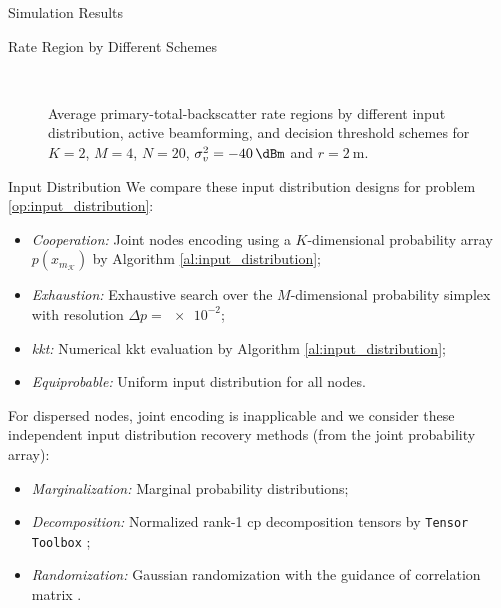 \documentclass[journal]{IEEEtran}
\begin{document}
\begin{section}{Simulation Results}
	\begin{subsection}{Rate Region by Different Schemes}
		\begin{figure}[!t]
			\centering
			\subfloat[Input Distribution, $Q=1$\label{fg:region_distribution}]{
				\resizebox{0.6\columnwidth}{!}{
					
				}
			}
			\\
			\subfloat[Active Beamforming, $Q=4$\label{fg:region_beamforming}]{
				\resizebox{0.48\columnwidth}{!}{
					
				}
			}
			\subfloat[Decision Threshold, $Q=4$\label{fg:region_threshold}]{
				\resizebox{0.48\columnwidth}{!}{
					
				}
			}
			\caption{
				Average primary-total-backscatter rate regions by different input distribution, active beamforming, and decision threshold schemes for $K=2$, $M=4$, $N=20$, $\sigma_v^2=\SI{-40}{\dBm}$ and $r=\SI{2}{\meter}$.
			}
		\end{figure}
		\begin{subsubsection}{Input Distribution}
			We compare these input distribution designs for problem \eqref{op:input_distribution}:
			\begin{itemize}
				\item \emph{Cooperation:} Joint nodes encoding using a $K$-dimensional probability array $p(x_{m_{\mathcal{K}}})$ by Algorithm \ref{al:input_distribution};
				\item \emph{Exhaustion:} Exhaustive search over the $M$-dimensional probability simplex with resolution $\Delta p = \num{e-2}$;
				\item \emph{\gls{kkt}:} Numerical \gls{kkt} evaluation by Algorithm \ref{al:input_distribution};
				\item \emph{Equiprobable:} Uniform input distribution for all nodes.
			\end{itemize}
			For dispersed nodes, joint encoding is inapplicable and we consider these independent input distribution recovery methods (from the joint probability array):
			\begin{itemize}
				\item \emph{Marginalization:} Marginal probability distributions;
				\item \emph{Decomposition:} Normalized rank-\num{1} \gls{cp} decomposition tensors by \texttt{Tensor Toolbox} \cite{Bader2022};
				\item \emph{Randomization:} Gaussian randomization with the guidance of correlation matrix \cite{Calvo2010}.
			\end{itemize}


\end{subsubsection}
\end{subsection}
\end{section}
\end{document}
